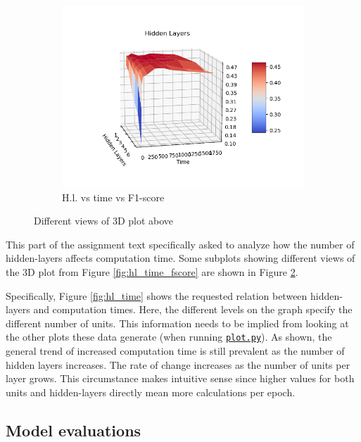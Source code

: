 \begin{figure}
\begin{subfigure}[b]{0.3\textwidth}
         \centering
         \includegraphics[width=\textwidth]{pictures/hl_time_fscore2.png}
         \caption{H.l. vs time vs F1-score}
         \label{fig:hl_time_score2}
     \end{subfigure}
        \caption{Different views of 3D plot above}
        \label{fig:three3Dgraphs}
\end{figure}

This part of the assignment text specifically asked to analyze how the number of hidden-layers affects computation time. Some subplots showing different views of the 3D plot from Figure \ref{fig:hl_time_fscore} are shown in Figure \ref{fig:three3Dgraphs}.

Specifically, Figure \ref{fig:hl_time} shows the requested relation between hidden-layers and computation times. Here, the different levels on the graph specify the different number of units. This information needs to be implied from looking at the other plots these data generate (when running \href{https://github.uio.no/fabior/IN5550/blob/master/Oblig1/plot.py}{\texttt{plot.py}}). As shown, the general trend of increased computation time is still prevalent as the number of hidden layers increases. The rate of change increases as the number of units per layer grows. This circumstance makes intuitive sense since higher values for both units and hidden-layers directly mean more calculations per epoch.


\subsection{Model evaluations}
\label{chap:Model evaluations}

